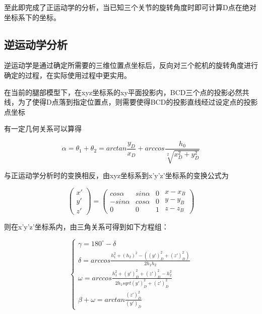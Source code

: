 \documentclass[10pt]{article}
\begin{document}
至此即完成了正运动学的分析，当已知三个关节的旋转角度时即可计算D点在绝对坐标系下的坐标。

\subsection{逆运动学分析}
逆运动学是通过确定所需要的三维位置点坐标后，反向对三个舵机的旋转角度进行确定的过程，在实际使用过程中更实用。

在当前的腿部模型下，在xyz坐标系的xy平面投影内，BCD三个点的投影必然共线，为了使得D点落到指定位置点，则需要使得BCD的投影直线经过设定点的投影点坐标

有一定几何关系可以算得

\begin{equation}
	\alpha = \theta_1 + \theta_2 = arctan \frac{y_D}{x_D} + arccos \frac{h_0}{\sqrt[2]{x_D^2 + y_D^2}}
\end{equation}

与正运动学分析时的变换相反，由xyz坐标系到x'y'z'坐标系的变换公式为

\begin{equation}
	\left(
		\begin{array}{c}
			x' \\
			y' \\
			z'
		\end{array}
	\right)
	=
	\left(
		\begin{array}{ccc}
			cos\alpha & sin\alpha & 0 \\
			-sin\alpha & cos\alpha & 0 \\
			0 & 0 & 1
		\end{array}
		\begin{array}{c}
			x-x_B \\
			y-y_B \\
			z-z_B 	
		\end{array}
	\right)
\end{equation}

则在x'y'z'坐标系内，由三角关系可得到如下方程组：

\begin{equation}
	\left\{
	\begin{array}{l}
		\gamma = 180^\circ - \delta \\
		\delta = arccos \frac{h_1^2+(h_2)^2-((y')_D^2+(z')_D^2)}{2h_1 h_2} \\
		\omega = arccos \frac{h_1^2+(y')_D^2+(z')_D^2-h_2^2}{2h_1 sqrt{(y')_D^2+(z')_D^2}} \\
		\beta + \omega = arctan \frac{(z')_D^2}{(y')_D}
	\end{array}
	\right.
\end{equation}
\end{document}
